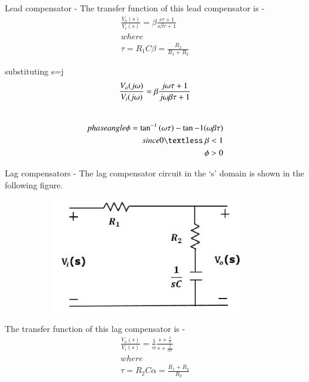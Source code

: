 \begin{enumerate}[label=\thesection.\arabic*.,ref=\thesection.\theenumi]
Lead compensator - 
The transfer function of this lead compensator is -
\begin{align}
    \frac{V_o(s)}{V_i(s)} = \beta  \frac{s \tau +1}{s\beta \tau +1} \\
where\\
\tau = R_1C  \beta =\frac{R_2}{R_1+R_2}
\end{align}

\vspace{0.3cm}substituting s=j\omega \\
\centering
\begin{equation}
\centering
 \frac{V_o(j\omega)}{V_i(j\omega)} = \beta  \frac{j\omega \tau +1}{j \omega\beta \tau +1}
\end{equation}
\\
\begin{align}
phase angle \phi = \tan^{-1} {(\omega\tau)} - \tan{-1}{(\omega\beta\tau)}\\
since 0 \textless \ \beta < 1\\
\phi > 0
\end{align}




Lag compensators - 
The lag compensator circuit in the ‘s’ domain is shown in the following figure.
 
\begin{figure}[h]
 
\begin{subfigure}{0.5\textwidth}
\includegraphics[width=0.9\linewidth, height=5cm ,inner]{./figs/ee18btech11027/lag_compensator.eps} 
\label{fig:subim1}
\end{subfigure}
\end{figure}

The transfer function of this lag compensator is -
\begin{align}
    \frac{V_o(s)}{V_i(s)} = \frac{1}{\alpha}  \frac{s + \frac{1}{\tau}}{s + \frac{1}{\alpha\tau}} \\
where\\
 \tau = R_2C  \alpha =\frac{R_1+R_2}{R_2}
\end{align}


\end{enumerate}
